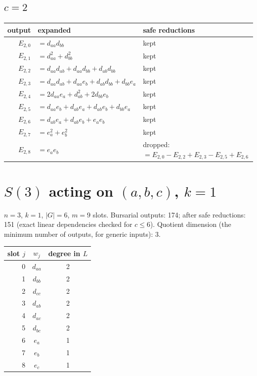 \documentclass[10pt]{article}
\begin{document}
\subsection*{$c = 2$}
\begin{longtable}{r>{\raggedright\arraybackslash}p{}>{\raggedright\arraybackslash}p{}}
output & expanded & safe reductions \\ \hline
$E_{2,0}$ & $= d_{aa} d_{bb}$ & kept \\
$E_{2,1}$ & $= d_{aa}^{2} + d_{bb}^{2}$ & kept \\
$E_{2,2}$ & $= d_{aa} d_{ab} + d_{aa} d_{bb} + d_{ab} d_{bb}$ & kept \\
$E_{2,3}$ & $= d_{aa} d_{ab} + d_{aa} e_{b} + d_{ab} d_{bb} + d_{bb} e_{a}$ & kept \\
$E_{2,4}$ & $= 2 d_{aa} e_{a} + d_{ab}^{2} + 2 d_{bb} e_{b}$ & kept \\
$E_{2,5}$ & $= d_{aa} e_{b} + d_{ab} e_{a} + d_{ab} e_{b} + d_{bb} e_{a}$ & kept \\
$E_{2,6}$ & $= d_{ab} e_{a} + d_{ab} e_{b} + e_{a} e_{b}$ & kept \\
$E_{2,7}$ & $= e_{a}^{2} + e_{b}^{2}$ & kept \\
$E_{2,8}$ & $= e_{a} e_{b}$ & dropped: $= E_{2,0} - E_{2,2} + E_{2,3} - E_{2,5} + E_{2,6}$ \\
\end{longtable}

\clearpage
\section{$S(3)$ acting on $(a, b, c)$, $k = 1$}
$n = 3$, $k = 1$, $|G| = 6$, $m = 9$ slots. Bursarial outputs: 174; after safe reductions: 151 (exact linear dependencies checked for $c \le 6$). Quotient dimension (the minimum number of outputs, for generic inputs): 3.

\begin{longtable}{rcc}
slot $j$ & $w_j$ & degree in $L$ \\ \hline
0 & $d_{aa}$ & 2 \\
1 & $d_{bb}$ & 2 \\
2 & $d_{cc}$ & 2 \\ \hline
3 & $d_{ab}$ & 2 \\
4 & $d_{ac}$ & 2 \\
5 & $d_{bc}$ & 2 \\ \hline
6 & $e_{a}$ & 1 \\
7 & $e_{b}$ & 1 \\
8 & $e_{c}$ & 1 \\ \hline
\end{longtable}
\end{document}
